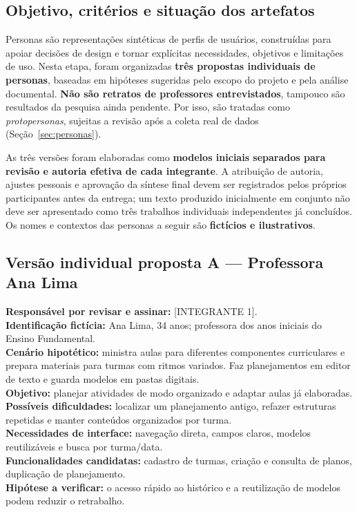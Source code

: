 \documentclass[12pt,a4paper,oneside]{report}
\begin{document}
\subsection{Objetivo, critérios e situação dos artefatos}
Personas são representações sintéticas de perfis de usuários, construídas para apoiar decisões de design e tornar explícitas necessidades, objetivos e limitações de uso. Nesta etapa, foram organizadas \textbf{três propostas individuais de personas}, baseadas em hipóteses sugeridas pelo escopo do projeto e pela análise documental. \textbf{Não são retratos de professores entrevistados}, tampouco são resultados da pesquisa ainda pendente. Por isso, são tratadas como \emph{protopersonas}, sujeitas a revisão após a coleta real de dados (Seção~\ref{sec:personas}).

As três versões foram elaboradas como \textbf{modelos iniciais separados para revisão e autoria efetiva de cada integrante}. A atribuição de autoria, ajustes pessoais e aprovação da síntese final devem ser registrados pelos próprios participantes antes da entrega; um texto produzido inicialmente em conjunto não deve ser apresentado como três trabalhos individuais independentes já concluídos. Os nomes e contextos das personas a seguir são \textbf{fictícios e ilustrativos}.

\subsection{Versão individual proposta A --- Professora Ana Lima}
\noindent\textbf{Responsável por revisar e assinar:} [INTEGRANTE 1].\\
\textbf{Identificação fictícia:} Ana Lima, 34 anos; professora dos anos iniciais do Ensino Fundamental.\\
\textbf{Cenário hipotético:} ministra aulas para diferentes componentes curriculares e prepara materiais para turmas com ritmos variados. Faz planejamentos em editor de texto e guarda modelos em pastas digitais.\\
\textbf{Objetivo:} planejar atividades de modo organizado e adaptar aulas já elaboradas.\\
\textbf{Possíveis dificuldades:} localizar um planejamento antigo, refazer estruturas repetidas e manter conteúdos organizados por turma.\\
\textbf{Necessidades de interface:} navegação direta, campos claros, modelos reutilizáveis e busca por turma/data.\\
\textbf{Funcionalidades candidatas:} cadastro de turmas, criação e consulta de planos, duplicação de planejamento.\\
\textbf{Hipótese a verificar:} o acesso rápido ao histórico e a reutilização de modelos podem reduzir o retrabalho.
\end{document}
